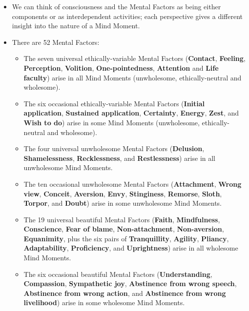 \begin{itemize}

\item We can think of consciousness and the Mental Factors as being either components or as interdependent activities; each perspective gives a different insight into the nature of a Mind Moment.

\item There are 52 Mental Factors:

\begin{itemize}

\item The seven universal ethically-variable Mental Factors (\textbf{Contact}, \textbf{Feeling}, \textbf{Perception}, \textbf{Volition}, \textbf{One-pointedness}, \textbf{Attention} and \textbf{Life faculty}) arise in all Mind Moments (unwholesome, ethically-neutral and wholesome).

\item The six occasional ethically-variable Mental Factors (\textbf{Initial application}, \textbf{Sustained application}, \textbf{Certainty}, \textbf{Energy}, \textbf{Zest}, and \textbf{Wish to do}) arise in some Mind Moments (unwholesome, ethically-neutral and wholesome).

\item The four universal unwholesome Mental Factors (\textbf{Delusion}, \textbf{Shamelessness}, \textbf{Recklessness}, and \textbf{Restlessness}) arise in all unwholesome Mind Moments.

\item The ten occasional unwholesome Mental Factors (\textbf{Attachment}, \textbf{Wrong view}, \textbf{Conceit}, \textbf{Aversion}, \textbf{Envy}, \textbf{Stinginess}, \textbf{Remorse}, \textbf{Sloth}, \textbf{Torpor}, and \textbf{Doubt}) arise in some unwholesome Mind Moments.

\item The 19 universal beautiful Mental Factors (\textbf{Faith}, \textbf{Mindfulness}, \textbf{Conscience}, \textbf{Fear of blame}, \textbf{Non-attachment}, \textbf{Non-aversion}, \textbf{Equanimity}, plus the six pairs of \textbf{Tranquillity}, \textbf{Agility}, \textbf{Pliancy}, \textbf{Adaptability}, \textbf{Proficiency}, and \textbf{Uprightness}) arise in all wholesome Mind Moments.

\item The six occasional beautiful Mental Factors (\textbf{Understanding}, \textbf{Compassion}, \textbf{Sympathetic joy}, \textbf{Abstinence from wrong speech}, \textbf{Abstinence from wrong action}, and \textbf{Abstinence from wrong livelihood}) arise in some wholesome Mind Moments.


\end{itemize}
\end{itemize}
